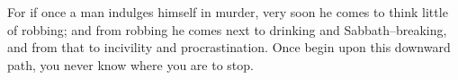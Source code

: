 For if once a man indulges himself in murder, very soon he comes to
think little of robbing; and from robbing he comes next to drinking and
Sabbath--breaking, and from that to incivility and procrastination.
Once begin upon this downward path, you never know where you are to
stop.

